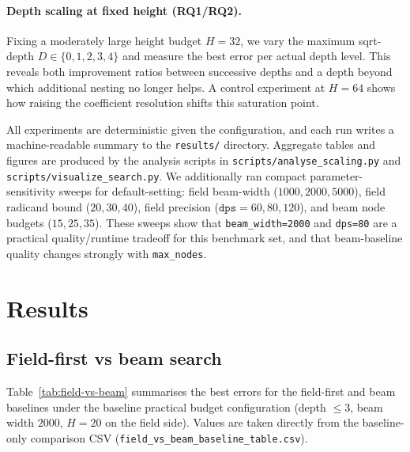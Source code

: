 \documentclass[11pt]{article}
\begin{document}
\paragraph{Depth scaling at fixed height (RQ1/RQ2).}
Fixing a moderately large height budget $H=32$, we vary the maximum sqrt-depth $D \in \{0,1,2,3,4\}$ and measure the best error per actual depth level.
This reveals both improvement ratios between successive depths and a depth beyond which additional nesting no longer helps.
A control experiment at $H=64$ shows how raising the coefficient resolution shifts this saturation point.

All experiments are deterministic given the configuration, and each run writes a machine-readable summary to the \texttt{results/} directory.
Aggregate tables and figures are produced by the analysis scripts in \texttt{scripts/analyse\_scaling.py} and \texttt{scripts/visualize\_search.py}.
We additionally ran compact parameter-sensitivity sweeps for default-setting: field beam-width (\(1000,2000,5000\)), field radicand bound (\(20,30,40\)), field precision (\(\texttt{dps}=60,80,120\)), and beam node budgets (\(15,25,35\)).
These sweeps show that \texttt{beam\_width=2000} and \texttt{dps=80} are a practical quality/runtime tradeoff for this benchmark set, and that beam-baseline quality changes strongly with \texttt{max\_nodes}.

\section{Results}

\subsection{Field-first vs beam search}

Table~\ref{tab:field-vs-beam} summarises the best errors for the field-first and beam baselines under the baseline practical budget configuration (depth $\le 3$, beam width $2000$, $H=20$ on the field side).
Values are taken directly from the baseline-only comparison CSV (\texttt{field\_vs\_beam\_baseline\_table.csv}).
\end{document}
